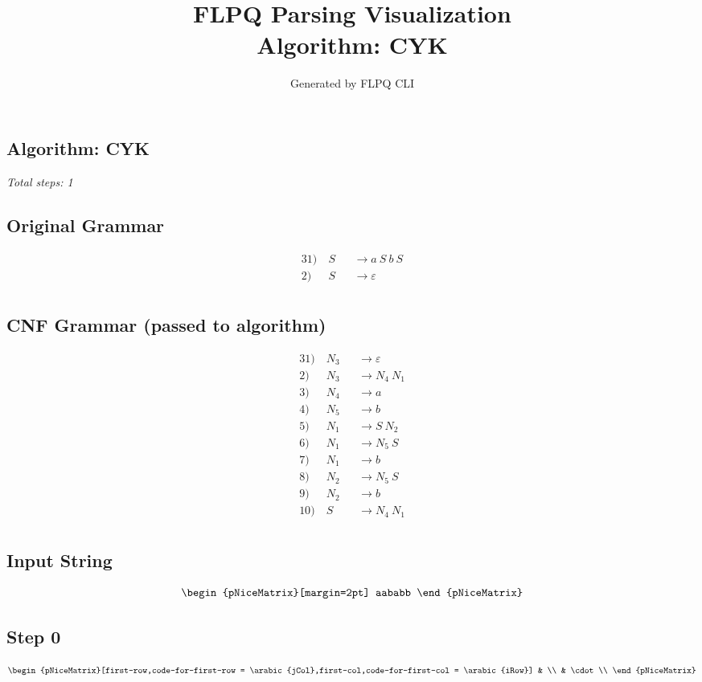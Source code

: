 \documentclass[12pt]{article}
\title{FLPQ Parsing Visualization\\Algorithm: CYK}
\author{Generated by FLPQ CLI}
\date{}
\begin{document}
\maketitle
\tableofcontents

\subsection*{Algorithm: CYK}
\textit{Total steps: 1}\\

\subsection*{Original Grammar}
\begin{center}
\begin{alignat*}{3}
1) \ & S &&\rightarrow a\ S\ b\ S \\
2) \ & S &&\rightarrow \varepsilon \\
\end{alignat*}
\end{center}

\subsection*{CNF Grammar (passed to algorithm)}
\begin{center}
\begin{alignat*}{3}
1) \ & N_3 &&\rightarrow \varepsilon \\
2) \ & N_3 &&\rightarrow N_4\ N_1 \\
3) \ & N_4 &&\rightarrow a \\
4) \ & N_5 &&\rightarrow b \\
5) \ & N_1 &&\rightarrow S\ N_2 \\
6) \ & N_1 &&\rightarrow N_5\ S \\
7) \ & N_1 &&\rightarrow b \\
8) \ & N_2 &&\rightarrow N_5\ S \\
9) \ & N_2 &&\rightarrow b \\
10) \ & S &&\rightarrow N_4\ N_1 \\
\end{alignat*}
\end{center}

\subsection*{Input String}
\begin{center}
\[
\begin{pNiceMatrix}[margin=2pt] aababb \end{pNiceMatrix}
\]
\end{center}

\subsection*{Step 0}
\begin{center}
\[
\begin{pNiceMatrix}[first-row,code-for-first-row = \arabic{jCol},first-col,code-for-first-col = \arabic{iRow}]
 &  \\
 & \cdot \\
\end{pNiceMatrix}
\]
\end{center}
\end{document}

